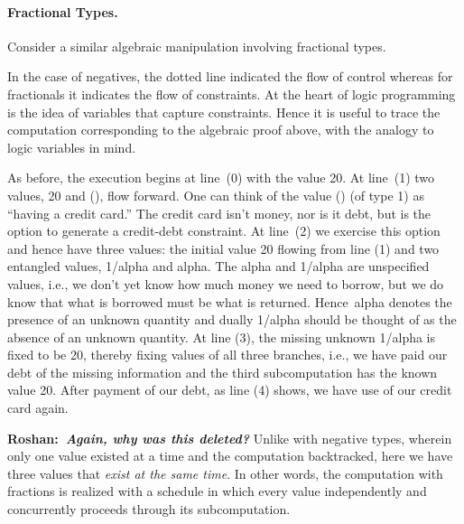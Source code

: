 \documentclass[preprint]{sigplanconf}
\newcommand{\xcomment}[2]{\textbf{#1:~\textsl{#2}}}
\newcommand{\roshan}[1]{\xcomment{Roshan}{#1}}
\begin{document}
\paragraph*{Fractional Types.} 
Consider a similar algebraic manipulation involving fractional types.
\begin{center}
\end{center}
In the case of negatives, the dotted line indicated the flow of control
whereas for fractionals it indicates the flow of constraints. At the heart of
logic programming is the idea of variables that capture constraints. Hence it
is useful to trace the computation corresponding to the algebraic proof
above, with the analogy to logic variables in mind.

As before, the execution begins at line~(0) with the value {{20}}. At
line~(1) two values, {{20}} and {{()}}, flow forward. One can think of the
value {{()}} (of type {{1}}) as ``having a credit card.'' The credit card
isn't money, nor is it debt, but is the option to generate a credit-debt
constraint.  At line~(2) we exercise this option and hence have three values:
the initial value {{20}} flowing from line (1) and two entangled values,
{{1/alpha}} and {{alpha}}. The {{alpha}} and {{1/alpha}} are unspecified
values, i.e., we don't yet know how much money we need to borrow, but we do
know that what is borrowed must be what is returned. Hence~{{alpha}} denotes
the presence of an unknown quantity and dually {{1/alpha}} should be thought
of as the absence of an unknown quantity.
At line (3), the missing unknown {{1/alpha}} is fixed to be {{20}}, thereby
fixing values of all three branches, i.e., we have paid our debt of the missing
information and the third subcomputation has the known value {{20}}. After
payment of our debt, as line (4) shows, we have use of our credit card again.

\roshan{Again, why was this deleted?}
Unlike with negative types, wherein only one value existed at a time and the
computation backtracked, here we have three values that \emph{exist at the
  same time}. In other words, the computation with fractions is realized with
a schedule in which every value independently and concurrently proceeds
through its subcomputation.
\end{document}
